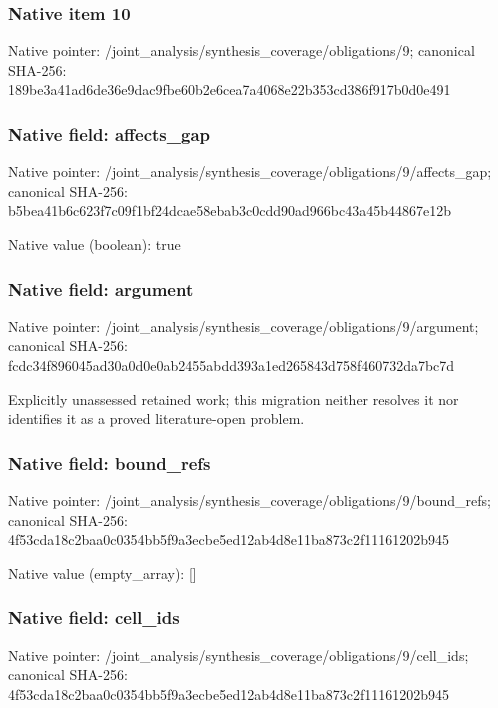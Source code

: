 \documentclass[10pt,a4paper]{article}
\begin{document}
\subsubsection{Native item 10}
Native pointer: /joint\_\allowbreak{}analysis/synthesis\_\allowbreak{}coverage/obligations/9; canonical SHA-256: 189be3a41ad6de36e9dac9fbe60b2e6cea7a4068e22b353cd386f917b0d0e491

\subsubsection{Native field: affects\_\allowbreak{}gap}
Native pointer: /joint\_\allowbreak{}analysis/synthesis\_\allowbreak{}coverage/obligations/9/affects\_\allowbreak{}gap; canonical SHA-256: b5bea41b6c623f7c09f1bf24dcae58ebab3c0cdd90ad966bc43a45b44867e12b

Native value (boolean): true

\subsubsection{Native field: argument}
Native pointer: /joint\_\allowbreak{}analysis/synthesis\_\allowbreak{}coverage/obligations/9/argument; canonical SHA-256: fcdc34f896045ad30a0d0e0ab2455abdd393a1ed265843d758f460732da7bc7d

\begingroup\raggedright\sloppy Explicitly unassessed retained work;\allowbreak{} this migration neither resolves it nor identifies it as a proved literature-open problem.\par\endgroup

\subsubsection{Native field: bound\_\allowbreak{}refs}
Native pointer: /joint\_\allowbreak{}analysis/synthesis\_\allowbreak{}coverage/obligations/9/bound\_\allowbreak{}refs; canonical SHA-256: 4f53cda18c2baa0c0354bb5f9a3ecbe5ed12ab4d8e11ba873c2f11161202b945

Native value (empty\_\allowbreak{}array): []

\subsubsection{Native field: cell\_\allowbreak{}ids}
Native pointer: /joint\_\allowbreak{}analysis/synthesis\_\allowbreak{}coverage/obligations/9/cell\_\allowbreak{}ids; canonical SHA-256: 4f53cda18c2baa0c0354bb5f9a3ecbe5ed12ab4d8e11ba873c2f11161202b945
\end{document}
